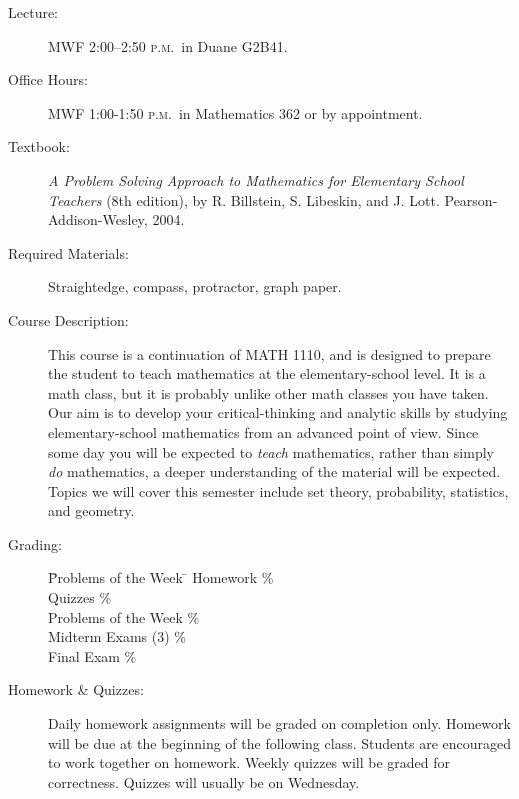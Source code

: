 \documentclass[11pt]{article}
\newcommand{\PM}{\textsc{p.m.}}
\newcommand{\book}[1]{\textit{#1}}
\begin{document}
\begin{description}

\item[Lecture:] MWF 2:00--2:50 \PM\ in Duane G2B41.

\item[Office Hours:] MWF 1:00-1:50 \PM\ in Mathematics 362 or by appointment.

\item[Textbook: ]
\book{A Problem Solving Approach to Mathematics for Elementary School Teachers} (8th edition), by R. Billstein, S. Libeskin, and J. Lott. Pearson-Addison-Wesley, 2004.

\item[Required Materials:] Straightedge, compass, protractor, graph paper.

\item[Course Description:]
This course is a continuation of MATH 1110, and is designed to prepare the student to teach mathematics  at the elementary-school level. It is a math class, but it is probably unlike other math classes you have taken. Our aim is to develop your critical-thinking and analytic skills by studying elementary-school mathematics from an advanced point of view. Since some day you will be expected to \emph{teach} mathematics, rather than simply \emph{do} mathematics, a deeper understanding of the material will be expected. Topics we will cover this semester include set theory, probability, statistics, and geometry.

\item[Grading: ]
\begin{tabbing}
\hspace{0.5 in}    \= Problems of the Week \quad  \=    \kill
\> Homework  \%    \\
\> Quizzes  \%    \\
\> Problems of the Week  \%    \\
\> Midterm Exams (3)  \% \\
\> Final Exam \% \\ 
\end{tabbing}

\vspace{-0.18 in}

\item[Homework \& Quizzes: ]
Daily homework assignments will be graded on completion only. Homework will be due at the beginning of the following class. Students are encouraged to work together on homework. Weekly quizzes will be graded for correctness. Quizzes will usually be on Wednesday.


\end{description}
\end{document}
